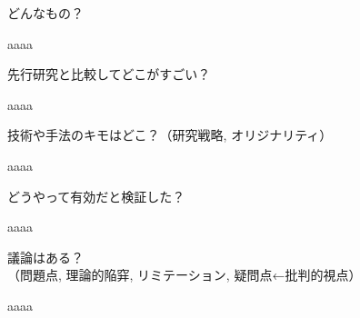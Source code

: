 \documentclass[a4j,11pt,twocolumn,dvipdfmx,platex]{jsarticle}
\begin{document}
%
%
%
%
%
%


\footnotesize
\begin{screen}
	どんなもの？
\end{screen}
%
aaaa


\vspace{4mm}
\begin{screen}
	先行研究と比較してどこがすごい？
\end{screen}
%
aaaa


\vspace{4mm}
\begin{screen}
	技術や手法のキモはどこ？（研究戦略, オリジナリティ）
\end{screen}
%
aaaa


\vspace{4mm}
\begin{screen}
	どうやって有効だと検証した？
\end{screen}
%
aaaa


\vspace{4mm}
\begin{screen}
	議論はある？\\（問題点, 理論的陥穽, リミテーション, 疑問点←批判的視点）
\end{screen}
%
aaaa
\end{document}
